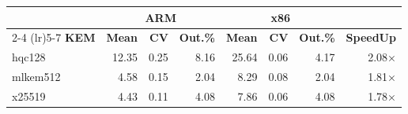 \begin{table}[!ht]
\begin{tabular}{lrrr|rrr|r}
 \toprule
& \multicolumn{3}{c}{\bfseries ARM} & \multicolumn{3}{c}{\bfseries x86} &\\
\cmidrule(lr){2-4} \cmidrule(lr){5-7}
\textbf{KEM} & \textbf{Mean} & \textbf{CV} & \textbf{Out.\%} & \textbf{Mean} & \textbf{CV} & \textbf{Out.\%} & \textbf{SpeedUp}\\
\midrule
hqc128 & 12.35 & 0.25 & 8.16 & 25.64 & 0.06 & 4.17 & 2.08× \\
mlkem512 & 4.58 & 0.15 & 2.04 & 8.29 & 0.08 & 2.04 & 1.81× \\
x25519 & 4.43 & 0.11 & 4.08 & 7.86 & 0.06 & 4.08 & 1.78× \\
\bottomrule
\end{tabular}
\end{table}
